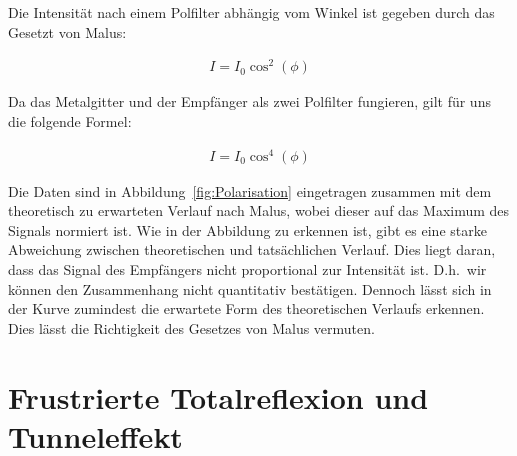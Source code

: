 \documentclass[a4paper,10pt,twocolumn]{article}
\begin{document}
    Die Intensität nach einem Polfilter abhängig vom Winkel ist gegeben durch das Gesetzt von Malus:
    
    \begin{align}
        I = I_0 \cos^2(\phi)
    \end{align}
    
    Da das Metalgitter und der Empfänger als zwei Polfilter fungieren, gilt für uns die folgende Formel:
    
    \begin{align}
        \label{eq:cos4}
        I = I_0 \cos^4( \phi )
    \end{align}
    
    
    Die Daten sind in Abbildung~\ref{fig:Polarisation} eingetragen zusammen mit dem theoretisch zu erwarteten
    Verlauf nach Malus, wobei dieser auf das Maximum des Signals normiert ist.
    Wie in der Abbildung zu erkennen ist, gibt es eine starke Abweichung zwischen theoretischen und tatsächlichen
    Verlauf.
    Dies liegt daran, dass das Signal des Empfängers nicht proportional zur Intensität ist.
    D.h.\ wir können den Zusammenhang nicht quantitativ bestätigen.
    Dennoch lässt sich in der Kurve zumindest die erwartete Form des theoretischen Verlaufs erkennen.
    Dies lässt die Richtigkeit des Gesetzes von Malus vermuten.
    
    \section{Frustrierte Totalreflexion und Tunneleffekt}
    
\end{document}
